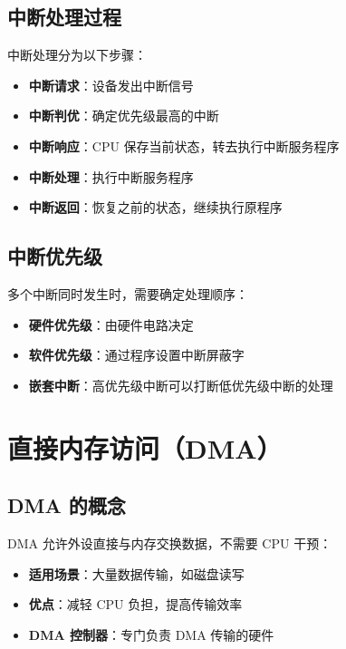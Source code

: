 \documentclass[12pt,UTF8]{ctexbook}
\begin{document}
\section{中断处理过程}

中断处理分为以下步骤：

\begin{itemize}[leftmargin=2cm]
    \item \textbf{中断请求}：设备发出中断信号
    \item \textbf{中断判优}：确定优先级最高的中断
    \item \textbf{中断响应}：CPU 保存当前状态，转去执行中断服务程序
    \item \textbf{中断处理}：执行中断服务程序
    \item \textbf{中断返回}：恢复之前的状态，继续执行原程序
\end{itemize}

\section{中断优先级}

多个中断同时发生时，需要确定处理顺序：

\begin{itemize}[leftmargin=2cm]
    \item \textbf{硬件优先级}：由硬件电路决定
    \item \textbf{软件优先级}：通过程序设置中断屏蔽字
    \item \textbf{嵌套中断}：高优先级中断可以打断低优先级中断的处理
\end{itemize}

\chapter{直接内存访问（DMA）}
\label{chap:dma}

\section{DMA 的概念}

DMA 允许外设直接与内存交换数据，不需要 CPU 干预：

\begin{itemize}[leftmargin=2cm]
    \item \textbf{适用场景}：大量数据传输，如磁盘读写
    \item \textbf{优点}：减轻 CPU 负担，提高传输效率
    \item \textbf{DMA 控制器}：专门负责 DMA 传输的硬件
\end{itemize}
\end{document}
